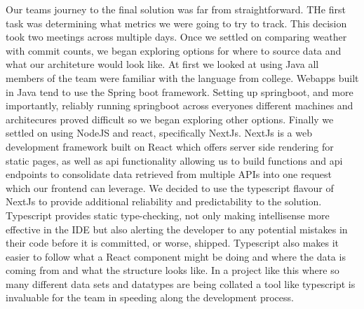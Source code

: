 \documentclass{article}
\begin{document}
Our teams journey to the final solution was far from straightforward. THe first task was determining what metrics we were going to try to track. This decision took two meetings across multiple days. Once we settled on comparing weather with commit counts, we began exploring options for where to source data and what our architeture would look like. At first we looked at using Java all members of the team were familiar with the language from college. Webapps built in Java tend to use the Spring boot framework. Setting up springboot, and more importantly, reliably running springboot across everyones different machines and architecures proved difficult so we began exploring other options. Finally we settled on using NodeJS and react, specifically NextJs. NextJs is a web development framework built on React which offers server side rendering for static pages, as well as api functionality allowing us to build functions and api endpoints to consolidate data retrieved from multiple APIs into one request which our frontend can leverage. We decided to use the typescript flavour of NextJs to provide additional reliability and predictability to the solution. Typescript provides static type-checking, not only making intellisense more effective in the IDE but also alerting the developer to any potential mistakes in their code before it is committed, or worse, shipped. Typescript also makes it easier to follow what a React component might be doing and where the data is coming from and what the structure looks like. In a project like this where so many different data sets and datatypes are being collated a tool like typescript is invaluable for the team in speeding along the development process. 
\end{document}
